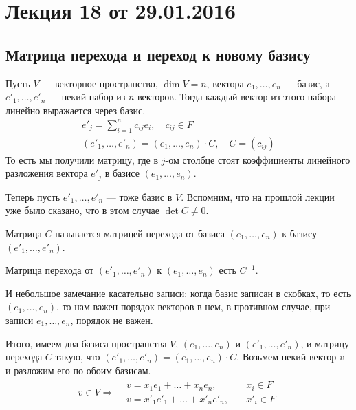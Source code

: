 


\renewcommand{\phi}{\varphi}
\newcommand{\Mat}{\mathrm{Mat}}
\newcommand{\id}{\mathrm{id}}
\newcommand{\izom}{\xrightarrow{\sim}}
\newcommand{\leftizom}{\xleftarrow{\sim}}
\section{Лекция 18 от 29.01.2016}

\subsection{Матрица перехода и переход к новому базису}
Пусть $V$ --- векторное пространство, $\dim V = n$, вектора $e_1, \ldots, e_n$ --- базис, а $e'_1, \ldots, e'_n$ --- некий набор из $n$ векторов. Тогда каждый вектор из этого набора линейно выражается через базис.
\begin{gather*}
e'_j = \sum_{i = 1}^{n} c_{ij}e_i, \quad c_{ij} \in F \\
(e'_1, \ldots, e'_n) = (e_1, \ldots, e_n) \cdot C, \quad C = (c_{ij})
\end{gather*}
То есть мы получили матрицу, где в $j$-ом столбце стоят коэффициенты линейного разложения вектора $e'_j$ в базисе $(e_1, \ldots, e_n)$.

Теперь пусть $e'_1, \ldots, e'_n$ --- тоже базис в $V$. Вспомним, что на прошлой лекции уже было сказано, что в этом случае $\det C \neq 0$.

\begin{Def}
Матрица $C$ называется матрицей перехода от базиса $(e_1, \ldots, e_n)$ к базису $(e'_1, \ldots, e'_n)$.
\end{Def}

\begin{Comment}
Матрица перехода от $(e'_1, \ldots, e'_n)$ к $(e_1, \ldots, e_n)$ есть $C^{-1}$.
\end{Comment}

И небольшое замечание касательно записи: когда базис записан в скобках, то есть $(e_1, \ldots, e_n)$, то нам важен порядок векторов в нем, в противном случае, при записи $e_1, \ldots, e_n$, порядок не важен.

Итого, имеем два базиса пространства $V$, $(e_1, \ldots, e_n)$ и $(e'_1, \ldots, e'_n)$, и матрицу перехода $C$ такую, что $(e'_1, \ldots, e'_n) = (e_1, \ldots, e_n) \cdot C$. Возьмем некий вектор $v$ и разложим его по обоим базисам.
\begin{gather*}
v \in V \Rightarrow 
\begin{aligned}
& v = x_1e_1 + \ldots + x_ne_n, \quad & x_i \in F \\
& v = x'_1e'_1 + \ldots + x'_ne'_n, \quad & x'_i \in F
\end{aligned}
\end{gather*}

